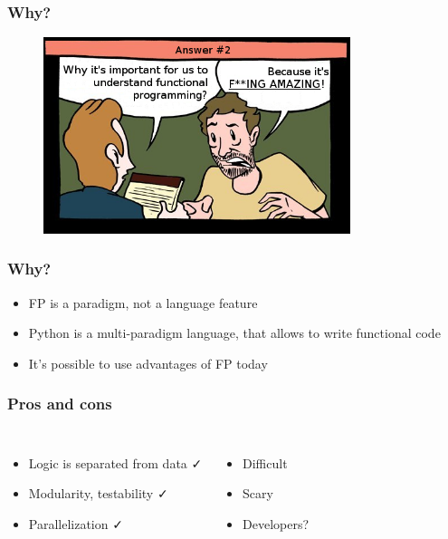 \documentclass[18pt, compress, aspectratio=169]{beamer}
\def\check{\textcolor{check}{\FA \faCheck}}
\def\fail{\textcolor{fail}{\FA \faRemove}}
\begin{document}
\begin{frame}
    \frametitle{Why?}
    \vspace{-25pt}
    \begin{figure}
        \includegraphics[width=0.8\textwidth,center]{second_option.png}
    \end{figure}
\end{frame}

\begin{frame}[fragile]
    \frametitle{Why?}
    \begin{itemize}[label={\MVRightarrow}]
        \item FP is a paradigm, not a language feature
        \item Python is a multi-paradigm language, that allows to write functional code
        \item It's possible to use advantages of FP today
    \end{itemize}
\end{frame}

\fontsize{15pt}{16}\selectfont
\begin{frame}
    \frametitle{Pros and cons}
    \vspace{-20pt}
    \begin{columns}[T,onlytextwidth]
    \begin{itemize}[label={\MVRightarrow}, leftmargin=-0.05cm]
            \item <+->Logic is separated from data  \check
            \item <+->Modularity, testability \check
            \item <+->Parallelization \check
        \end{itemize}

        \begin{itemize}[label={\MVRightarrow}]
            \item <+->Difficult \fail
            \item <+->Scary \fail
            \item <+->Developers? \fail
        \end{itemize}
    \end{columns}
\end{frame}
\fontsize{17pt}{18}\selectfont
\end{document}
